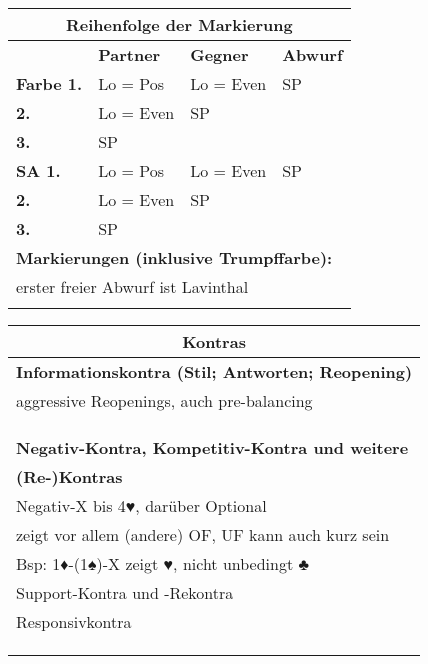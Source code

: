 \documentclass{article}
\begin{document}
\begin{multicols}{3}
\begin{tabularx}{\columnwidth}{|l|X|X|X|}
 \multicolumn{4}{|c|}{\bf Reihenfolge der Markierung} \\
\hline                & {\bf Partner} & {\bf Gegner} & {\bf Abwurf} \\
\hline \bf Farbe \hfill 1. & Lo = Pos  & Lo = Even & SP \\
\hline \bf       \hfill 2. & Lo = Even & SP        & \\
\hline \bf       \hfill 3. & SP        &           & \\
\hline \bf SA    \hfill 1. & Lo = Pos  & Lo = Even & SP \\
\hline \bf       \hfill 2. & Lo = Even & SP        & \\
\hline \bf       \hfill 3. & SP        &           & \\
\hline \multicolumn{4}{|l|}{\bf Markierungen (inklusive Trumpffarbe):} \\
\hline \multicolumn{4}{|l|}{erster freier Abwurf ist Lavinthal} \\
       \multicolumn{4}{|l|}{} \\
\hline
\end{tabularx}

\begin{tabularx}{\columnwidth}{|X|}
\hline \multicolumn{1}{|c|}{\bf \large Kontras} \\
\hline {\bf Informationskontra (Stil; Antworten; Reopening)} \\
\hline {aggressive Reopenings, auch pre-balancing} \\
       {} \\
       {} \\
       {} \\
\hline {\bf Negativ-Kontra, Kompetitiv-Kontra und weitere} \\
       {\bf (Re-)Kontras} \\
\hline {Negativ-X bis 4♥, darüber Optional} \\
       {zeigt vor allem (andere) OF, UF kann auch kurz sein} \\
       {Bsp: 1♦-(1♠)-X zeigt ♥, nicht unbedingt ♣} \\
       {Support-Kontra und -Rekontra} \\
       {Responsivkontra} \\
       {} \\
       {} \\
       {} \\
\hline \end{tabularx}


\end{multicols}
\end{document}
